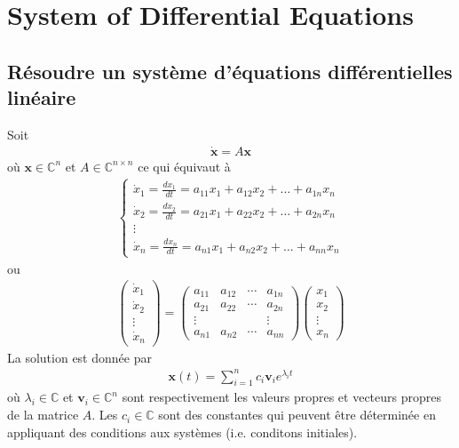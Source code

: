 \chapter{System of Differential Equations}

\section{Résoudre un système d'équations différentielles linéaire}
Soit
\begin{eqnarray}
	\mathbf{\dot x}=A\mathbf{x}
\end{eqnarray}
où $\mathbf{x}\in\mathbb C^n$ et $A\in \mathbb C^{n\times n}$
ce qui équivaut à
\begin{eqnarray}
	\begin{cases}
		\dot x_1=
		\frac{dx_1}{dt}=
		a_{11}x_1+a_{12}x_2+\dots+a_{1n}x_n
		\\
		\dot x_2=
		\frac{dx_2}{dt}=
		a_{21}x_1+a_{22}x_2+\dots+a_{2n}x_n
		\\
		\vdots 
		\\
		\dot x_n=
		\frac{dx_n}{dt}=
		a_{n1}x_1+a_{n2}x_2+\dots+a_{nn}x_n
	\end{cases}
\end{eqnarray}
ou
\begin{eqnarray}
	\begin{pmatrix}
		\dot x_1
		\\
		\dot x_2
		\\
		\vdots
		\\
		\dot x_n
	\end{pmatrix}
	=
	\begin{pmatrix}
		a_{11} & a_{12} & \cdots & a_{1n}
		\\
		a_{21} & a_{22} & \cdots & a_{2n}
		\\
		\vdots & & &\vdots
		\\
		a_{n1} & a_{n2} & \cdots & a_{nn}
	\end{pmatrix}
	\begin{pmatrix}
		x_1
		\\
		x_2
		\\
		\vdots
		\\
		x_n
	\end{pmatrix}
\end{eqnarray}
La solution est donnée par
\begin{eqnarray}
	\label{eq:generalSolutionLinDiffEq}
	\mathbf{x}(t)=\sum_{i=1}^n c_i \mathbf{v}_i e^{\lambda_it}
\end{eqnarray}
où $\lambda_i\in\mathbb C$ et $\mathbf{v}_i\in\mathbb C^n$ sont respectivement les valeurs propres et vecteurs propres de la matrice $A$. Les $c_i\in\mathbb C$ sont des constantes qui peuvent être déterminée en appliquant des conditions aux systèmes (i.e. conditons initiales).

